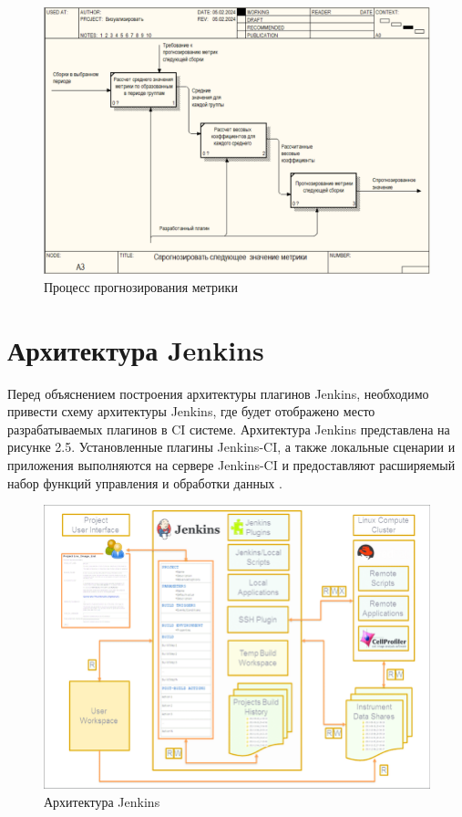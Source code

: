 \begin{figure}[ht!] 
	\center
	\includegraphics [scale=0.7] {my_folder/images//er3}
	\caption{Процесс прогнозирования метрики} 
	\label{fig:er3}  
\end{figure}

\section{Архитектура Jenkins} \label{ch1:sec2}

Перед объяснением построения архитектуры плагинов Jenkins, необходимо привести схему архитектуры Jenkins, где будет отображено место разрабатываемых плагинов в CI системе. Архитектура Jenkins представлена на рисунке 2.5. Установленные плагины Jenkins-CI, а также локальные сценарии и приложения выполняются на сервере Jenkins-CI и предоставляют расширяемый набор функций управления и обработки данных \cite{article}.

\begin{figure}[ht!] 
	\center
	\includegraphics [scale=0.47] {my_folder/images//ArchitectureJenkins}
	\caption{Архитектура Jenkins \cite{article}} 
	\label{fig:ArchitectureJenkins}  
\end{figure}


